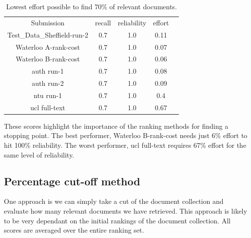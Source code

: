 \begin{table}[H]

\centering
\begin{tabular}{|c|c|c|c|c|} 
\hline
 Submission & recall & reliability & effort  \\ 
 Test\_Data\_Sheffield-run-2 & 0.7 &	1.0	&	0.11 \\ 
 Waterloo A-rank-cost & 0.7 &	1.0	&	0.07 \\ 
 Waterloo B-rank-cost & 0.7 &	1.0	&	0.06 \\ 
 auth run-1 & 0.7 &	1.0	&	0.08 \\ 
 auth run-2 & 0.7 &	1.0	&	0.09 \\ 
 ntu run-1 & 0.7 &	1.0	&	0.4 \\ 
 ucl full-text & 0.7 &	1.0	&	0.67 \\ 
 \hline
\end{tabular}

\caption{Lowest effort possible to find 70\% of relevant documents. }

\end{table}

These scores highlight the importance of the ranking methods for finding a stopping point. The best performer, Waterloo B-rank-cost needs just 6\% effort to hit 100\% reliability. The worst performer, ucl full-text requires 67\% effort for the same level of reliability.


\subsection{Percentage cut-off method} \label{perCutOffMethod}

One approach is we can simply take a cut of the document collection and evaluate how many relevant documents we have retrieved. This approach is likely to be very dependant on the initial rankings of the document collection. All scores are averaged over the entire ranking set.

